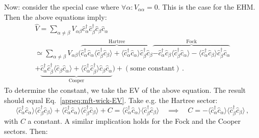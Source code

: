 Now: consider the special case where $\forall \alpha \colon V_{\alpha\alpha}=0$. This is the case for the EHM. Then the above equations imply:
\begin{multline*}
	\hat V = \sum_{\alpha\neq\beta} V_{\alpha\beta} \hat c_\alpha^\dagger \hat c_\beta^\dagger \hat c_\beta \hat c_\alpha \\
	\simeq \sum_{\alpha\neq\beta} V_{\alpha\beta} \Big(
	\overbrace{
		\hat c_\alpha^\dagger \hat c_\alpha \big\langle \hat c_\beta^\dagger \hat c_\beta \big\rangle + \big\langle \hat c_\alpha^\dagger \hat c_\alpha \big\rangle \hat c_\beta^\dagger \hat c_\beta
	}^{\text{Hartree}} \overbrace{
		- \hat c_\alpha^\dagger \hat c_\beta \big\langle \hat c_\beta^\dagger \hat c_\alpha \big\rangle - \big\langle \hat c_\alpha^\dagger \hat c_\beta \big\rangle \hat c_\beta^\dagger \hat c_\alpha
	}^{\text{Fock}} \\	
	+ \underbrace{
		\hat c_\alpha^\dagger \hat c_\beta^\dagger \big\langle \hat c_\beta \hat c_\alpha \big\rangle + \big\langle \hat c_\alpha^\dagger \hat c_\beta^\dagger \big\rangle \hat c_\beta \hat c_\alpha
	}_{\text{Cooper}}
	\Big) + (\text{some constant}) \, .
\end{multline*}
To determine the constant, we take the EV of the above equation. The result should equal Eq.~\eqref{appeq:mft-wick-EV}. Take e.g. the Hartree sector:
\[
\big\langle \hat c_\alpha^\dagger \hat c_\alpha \big\rangle \big\langle \hat c_\beta^\dagger \hat c_\beta \big\rangle + \big\langle \hat c_\alpha^\dagger \hat c_\alpha \big\rangle \big\langle \hat c_\beta^\dagger \hat c_\beta \big\rangle + C = \big\langle \hat c_\alpha^\dagger \hat c_\alpha \big\rangle  \big\langle \hat c_\beta^\dagger \hat c_\beta \big\rangle 
\quad\implies\quad
C = - \big\langle \hat c_\alpha^\dagger \hat c_\alpha \big\rangle  \big\langle \hat c_\beta^\dagger \hat c_\beta \big\rangle \, ,
\]
with $C$ a constant. A similar implication holds for the Fock and the Cooper sectors. Then:
